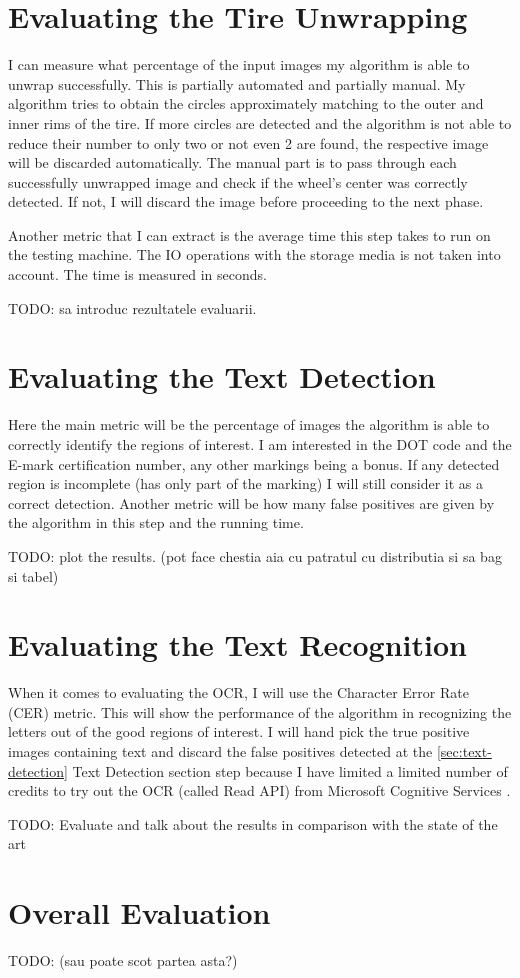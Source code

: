 \section{Evaluating the Tire Unwrapping}\label{section:evaluation-tire_unwrapping}

I can measure what percentage of the input images my algorithm is able to unwrap successfully. This is partially automated and partially manual. My algorithm tries to obtain the circles approximately matching to the outer and inner rims of the tire. If more circles are detected and the algorithm is not able to reduce their number to only two or not even 2 are found, the respective image will be discarded automatically. The manual part is to pass through each successfully unwrapped image and check if the wheel's center was correctly detected. If not, I will discard the image before proceeding to the next phase.

Another metric that I can extract is the average time this step takes to run on the testing machine. The IO operations with the storage media is not taken into account. The time is measured in seconds.

TODO: sa introduc rezultatele evaluarii.

\section{Evaluating the Text Detection}\label{section:evaluation-text_detection}

Here the main metric will be the percentage of images the algorithm is able to correctly identify the regions of interest. I am interested in the DOT code and the E-mark certification number, any other markings being a bonus. If any detected region is incomplete (has only part of the marking) I will still consider it as a correct detection. Another metric will be how many false positives are given by the algorithm in this step and the running time.

TODO: plot the results. (pot face chestia aia cu patratul cu distributia si sa bag si tabel)

\section{Evaluating the Text Recognition}\label{section:evaluation-ocr}

When it comes to evaluating the OCR, I will use the Character Error Rate (CER) \cite{site:evaluation-OCR-character_error_rate} metric. This will show the performance of the algorithm in recognizing the letters out of the good regions of interest. I will hand pick the true positive images containing text and discard the false positives detected at the \ref{sec:text-detection} Text Detection section step because I have limited a limited number of credits to try out the OCR (called Read API) from Microsoft Cognitive Services \cite{site:Microsoft_Cognitive_Services}.

TODO: Evaluate and talk about the results in comparison with the state of the art

\section{Overall Evaluation}\label{section:evaluation-overall}

TODO: (sau poate scot partea asta?)
